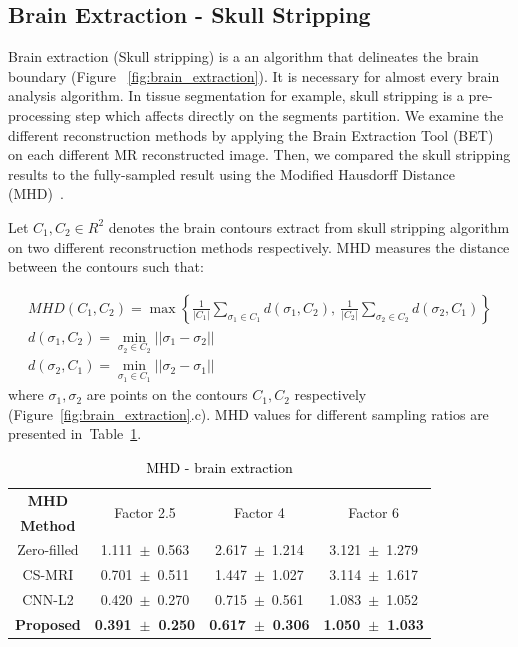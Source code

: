 \documentclass[review]{elsarticle}
\begin{document}
\subsection{Brain Extraction - Skull Stripping}
Brain extraction (Skull stripping) is a an algorithm that delineates the brain boundary (Figure~ \ref{fig:brain_extraction}). It is necessary for almost every brain analysis algorithm. In tissue segmentation for example, skull stripping is a pre-processing step which affects directly on the segments partition. We examine the different reconstruction methods by applying the Brain Extraction Tool (BET) \cite{smith2002fast} on each different MR reconstructed image. Then, we compared the skull stripping results to the fully-sampled result using the Modified Hausdorff Distance (MHD)~\cite{dubuisson1994modified}.

Let $C_1,C_2\in R^2$ denotes the brain contours extract from skull stripping algorithm on two different reconstruction methods respectively. MHD measures the distance between the contours such that:

\begin{equation}
\begin{array}{cc}
MHD(C_1,C_2) = \max \left\{\frac{1}{|C_1|} \sum_{\sigma_{1}\in C_1}^{}d(\sigma_1,C_2), ~ \frac{1}{|C_2|} \sum_{\sigma_{2}\in C_2}^{}d(\sigma_2,C_1)\right\} \\
d(\sigma_1,C_2) = \underset{\sigma_{2}\in C_{2}}{\min}||\sigma_1-\sigma_2|| \\
d(\sigma_2,C_1) = \underset{\sigma_{1}\in C_{1}}{\min}||\sigma_2-\sigma_1||
\end{array}
\end{equation}
where $\sigma_1,\sigma_2$ are points on the contours $C_1,C_2$ respectively (Figure~\ref{fig:brain_extraction}.c). MHD values for different sampling ratios are presented in~Table~\ref{tbl:MHD}.

\begin{table}[H]
	\centering{}
	\begin{tabular}{|c||c||c||c|}
		\hline 
		\textbf{MHD} & \multicolumn{1}{c||}{\multirow{2}{*}{Factor 2.5}} & \multicolumn{1}{c||}{\multirow{2}{*}{Factor 4}} & \multicolumn{1}{c|}{\multirow{2}{*}{Factor 6}} \tabularnewline
		\textbf{Method} & \multicolumn{1}{c||}{} & \multicolumn{1}{c||}{} & \multicolumn{1}{c|}{} \tabularnewline \cline{1-4}
				
		Zero-filled         &1.111~$\pm$~0.563  &2.617~$\pm$~1.214   &3.121~$\pm$~1.279\tabularnewline
		CS-MRI              &0.701~$\pm$~0.511  &1.447~$\pm$~1.027   &3.114~$\pm$~1.617\tabularnewline
		CNN-L2              &0.420~$\pm$~0.270  &0.715~$\pm$~0.561   &1.083~$\pm$~1.052\tabularnewline
		\textbf{Proposed}   &\textbf{0.391~$\pm$~0.250}  &\textbf{0.617~$\pm$~0.306}   &\textbf{1.050~$\pm$~1.033}\tabularnewline
		\hline 
	\end{tabular}\caption{\textcolor{black}{\footnotesize{}{}MHD - brain extraction}{\footnotesize{}\label{tbl:MHD}}}
\end{table}
\end{document}
